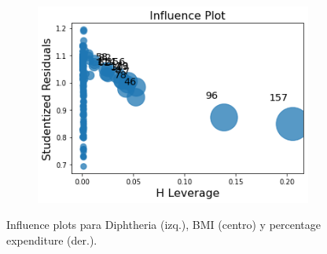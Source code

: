 \begin{figure}[H]
\begin{subfigure}{0.3\linewidth}
              \end{subfigure}
              \hfill
                \begin{subfigure}{0.3\linewidth}
                \centering
                \includegraphics[width=\textwidth]{img/influ/percent_exp.png}
              \end{subfigure}
               \caption{Influence plots para Diphtheria (izq.), BMI (centro) y percentage expenditure (der.).}
               
               \label{fig:inf_dift}
        \end{figure}
        